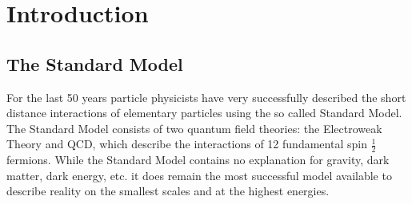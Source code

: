 \chapter{Introduction}

\section{The Standard Model}
\label{SM}
For the last 50 years particle physicists have very successfully described the short distance interactions of elementary particles using the so called Standard Model.  
The Standard Model consists of two quantum field theories: the Electroweak Theory and \gls{QCD}, which describe the interactions of 12 fundamental spin $\frac{1}{2}$ fermions.  
While the Standard Model contains no explanation for gravity, dark matter, dark energy, etc. it does remain the most successful model available to describe reality on the smallest scales and at the highest energies.  


